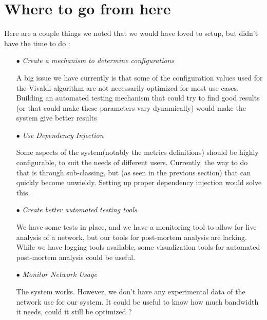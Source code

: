 \documentclass[11pt,a4paper]{article}
\begin{document}
\section{Where to go from here}
 Here are a couple things we noted that we would have loved to setup, but didn't have the time to do :
 
 \begin{itemize}
 	\item[$\bullet$]\emph{Create a mechanism to determine configurations }
 	
	A big issue we have currently is that some of the configuration values used for the Vivaldi algorithm are not necessarily optimized for most use cases. Building an automated testing mechanism that could try to find good results (or that could make these parameters vary dynamically) would make the system give better results
	
	\item[$\bullet$] \emph{Use Dependency Injection}
		
	Some aspects of the system(notably the metrics definitions) should be highly configurable, to suit the needs of different users. Currently, the way to do that is through sub-classing, but (as seen in the previous section) that can quickly become unwieldy. Setting up proper dependency injection would solve this.
	
	\item[$\bullet$] \emph{Create better automated testing tools}
	
	We have some tests in place, and we have a monitoring tool to allow for live analysis of a network, but our tools for post-mortem analysis are lacking. While we have logging tools available, some visualization tools for automated post-mortem analysis could be useful.

	\item[$\bullet$] \emph{Monitor Network Usage}
	
	The system works. However, we don't have any experimental data of the network use for our system. It could be useful to know how much bandwidth it needs, could it still be optimized ?  
	 
 \end{itemize}
\end{document}
